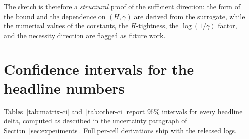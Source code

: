 The sketch is therefore a \emph{structural} proof of the sufficient
direction: the form of the bound and the dependence on $(H, \gamma)$
are derived from the surrogate, while the numerical values of the constants,
the $H$-tightness, the $\log(1/\gamma)$ factor, and the necessity
direction are flagged as future work.

\section{Confidence intervals for the headline numbers}
\label{app:ci}

Tables~\ref{tab:matrix-ci} and~\ref{tab:other-ci} report $95\%$ intervals
for every headline delta, computed as described in the uncertainty
paragraph of Section~\ref{sec:experiments}. Full per-cell derivations ship
with the released logs.

